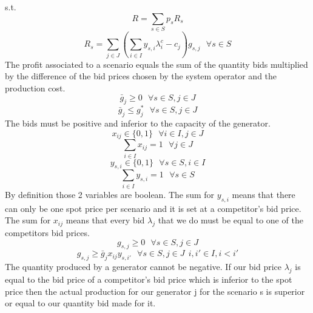 \documentclass[letterpaper]{article}
\begin{document}
s.t.\\
\begin{equation}
R = \sum_{s \in S} p_s R_s
\end{equation}
\begin{equation}
 R_s = \sum_{j \in J} \left(\sum_{i \in I} y_{s,i} \lambda^c_i - c_j\right) g_{s,j} \ \ \  \forall s \in S
\end{equation}
The profit associated to a scenario equals the sum of the quantity bids multiplied by the difference of the bid prices chosen by the system operator and the production cost.
\begin{equation}
\bar{g}_j \ge 0 \ \ \ \forall s \in S, j \in J
\end{equation}
\begin{equation}
\bar{g}_j \le g^*_j \ \ \ \forall s \in S, j \in J
\end{equation}
The bids must be positive and inferior to the capacity of the generator.\\
\begin{equation}
x_{ij} \in \{0,1\} \ \ \  \forall i \in I, j \in J
\end{equation}
\begin{equation}
\sum_{i \in I} x_{ij} = 1 \ \ \  \forall j \in J
\end{equation}
\begin{equation}
y_{s,i} \in \{0,1\} \ \ \  \forall s \in S, i \in I
\end{equation}
\begin{equation}
\sum_{i \in I} y_{s,i} = 1 \ \ \ \forall s \in S
\end{equation}
By definition those 2 variables are boolean. The sum for $y_{s,i}$ means that there can only be one spot price per scenario and it is set at a competitor's bid price. The sum for $x_{ij}$ means that every bid $\lambda_j$ that we do must be equal to one of the competitors bid prices.\\
\begin{equation}
g_{s,j} \ge 0 \ \ \ \forall s \in S, j \in J
\end{equation}
\begin{equation}
g_{s,j} \ge \bar{g}_j x_{ij} y_{s,i'} \ \ \ \forall s \in S, j \in J \ \ i, i' \in I, i < i' \label{cons:notlin1}
\end{equation}
The quantity produced by a generator cannot be negative. If our bid price $\lambda_j$ is equal to the bid price of a competitor's bid price which is inferior to the spot price then the actual production for our generator j for the scenario s is superior or equal to our quantity bid made for it.\\
\end{document}
